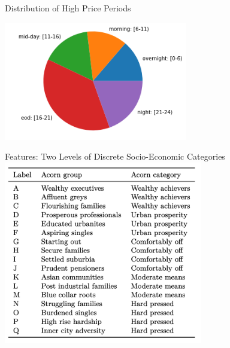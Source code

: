 \documentclass{beamer}
\begin{document}
\begin{frame}{Distribution of High Price Periods}
  \begin{center}
  \includegraphics[width=0.6\textwidth]{images/high-hours-dist.png}
  \end{center}
\end{frame}


\begin{frame}{Features: Two Levels of Discrete Socio-Economic Categories}
  \centering
  \includegraphics[width=0.65\textwidth]{images/acorn-groups.png}
\end{frame}
\end{document}
